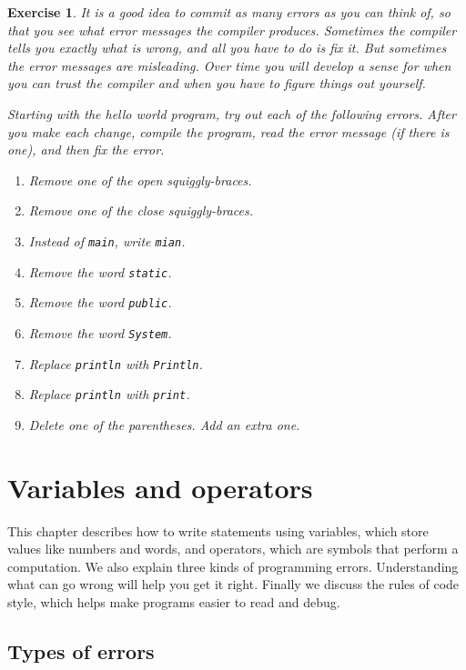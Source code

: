 \documentclass[12pt]{book}
\theoremstyle{exercise}
\newtheorem{exercise}{Exercise}[chapter]
\newcommand{\java}[1]{\verb"#1"}
\begin{document}
\begin{exercise}

It is a good idea to commit as many errors as you can think of, so that you see what error messages the compiler produces.
Sometimes the compiler tells you exactly what is wrong, and all you have to do is fix it.
But sometimes the error messages are misleading.
Over time you will develop a sense for when you can trust the compiler and when you have to figure things out yourself.

Starting with the hello world program, try out each of the following errors.
After you make each change, compile the program, read the error message (if there is one), and then fix the error.

\begin{enumerate}
\item Remove one of the open squiggly-braces.
\item Remove one of the close squiggly-braces.
\item Instead of \java{main}, write \java{mian}.
\item Remove the word \java{static}.
\item Remove the word \java{public}.
\item Remove the word \java{System}.
\item Replace \java{println} with \java{Println}.
\item Replace \java{println} with \java{print}.
\item Delete one of the parentheses.
Add an extra one.
\end{enumerate}


\end{exercise}


\chapter{Variables and operators}

This chapter describes how to write statements using variables, which store values like numbers and words, and operators, which are symbols that perform a computation.
We also explain three kinds of programming errors.
Understanding what can go wrong will help you get it right.
Finally we discuss the rules of code style, which helps make programs easier to read and debug.


\section{Types of errors}
\end{document}
